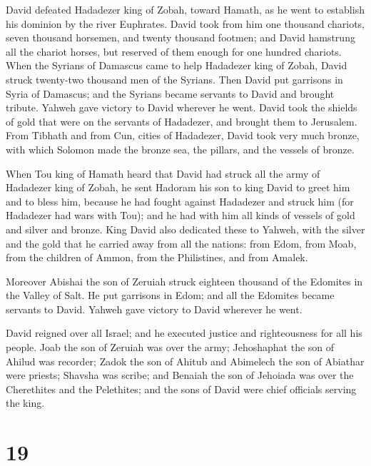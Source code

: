  David defeated Hadadezer king of Zobah, toward Hamath, as
he went to establish his dominion by the river Euphrates. 
David took from him one thousand chariots, seven thousand horsemen, and
twenty thousand footmen; and David hamstrung all the chariot horses, but
reserved of them enough for one hundred chariots.  When the
Syrians of Damascus came to help Hadadezer king of Zobah, David struck
twenty-two thousand men of the Syrians.  Then David put
garrisons in Syria of Damascus; and the Syrians became servants to David
and brought tribute. Yahweh gave victory to David wherever he went.
 David took the shields of gold that were on the servants of
Hadadezer, and brought them to Jerusalem.  From Tibhath and
from Cun, cities of Hadadezer, David took very much bronze, with which
Solomon made the bronze sea, the pillars, and the vessels of bronze.

 When Tou king of Hamath heard that David had struck all the
army of Hadadezer king of Zobah,  he sent Hadoram his son
to king David to greet him and to bless him, because he had fought
against Hadadezer and struck him (for Hadadezer had wars with Tou); and
he had with him all kinds of vessels of gold and silver and bronze.
 King David also dedicated these to Yahweh, with the silver
and the gold that he carried away from all the nations: from Edom, from
Moab, from the children of Ammon, from the Philistines, and from Amalek.

 Moreover Abishai the son of Zeruiah struck eighteen
thousand of the Edomites in the Valley of Salt.  He put
garrisons in Edom; and all the Edomites became servants to David. Yahweh
gave victory to David wherever he went.

 David reigned over all Israel; and he executed justice and
righteousness for all his people.  Joab the son of Zeruiah
was over the army; Jehoshaphat the son of Ahilud was recorder;
 Zadok the son of Ahitub and Abimelech the son of Abiathar
were priests; Shavsha was scribe;  and Benaiah the son of
Jehoiada was over the Cherethites and the Pelethites; and the sons of
David were chief officials serving the king.

\hypertarget{section-18}{%
\section{19}\label{section-18}}

